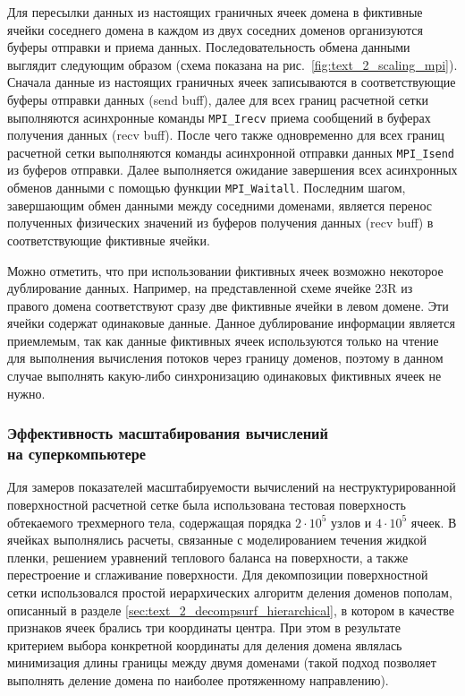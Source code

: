 Для пересылки данных из настоящих граничных ячеек домена в фиктивные ячейки соседнего домена в каждом из двух соседних доменов организуются буферы отправки и приема данных.
Последовательность обмена данными выглядит следующим образом (схема показана на рис.~\ref{fig:text_2_scaling_mpi}).
Сначала данные из настоящих граничных ячеек записываются в соответствующие буферы отправки данных (send buff), далее для всех границ расчетной сетки выполняются асинхронные команды \texttt{MPI\_Irecv} приема сообщений в буферах получения данных (recv buff).
После чего также одновременно для всех границ расчетной сетки выполняются команды асинхронной отправки данных \texttt{MPI\_Isend} из буферов отправки.
Далее выполняется ожидание завершения всех асинхронных обменов данными с помощью функции \texttt{MPI\_Waitall}.
Последним шагом, завершающим обмен данными между соседними доменами, является перенос полученных физических значений из буферов получения данных (recv buff) в соответствующие фиктивные ячейки.

Можно отметить, что при использовании фиктивных ячеек возможно некоторое дублирование данных.
Например, на представленной схеме ячейке 23R из правого домена соответствуют сразу две фиктивные ячейки в левом домене.
Эти ячейки содержат одинаковые данные.
Данное дублирование информации является приемлемым, так как данные фиктивных ячеек используются только на чтение для выполнения вычисления потоков через границу доменов, поэтому в данном случае выполнять какую-либо синхронизацию одинаковых фиктивных ячеек не нужно.

\subsubsection{Эффективность масштабирования вычислений \\ на суперкомпьютере}

Для замеров показателей масштабируемости вычислений на неструктурированной поверхностной расчетной сетке была использована тестовая поверхность обтекаемого трехмерного тела, содержащая порядка $2 \cdot 10^5$ узлов и $4 \cdot 10^5$ ячеек.
В ячейках выполнялись расчеты, связанные с моделированием течения жидкой пленки, решением уравнений теплового баланса на поверхности, а также перестроение и сглаживание поверхности.
Для декомпозиции поверхностной сетки использовался простой иерархических алгоритм деления доменов пополам\label{term:alg_decomp_hierarch3}, описанный в разделе \ref{sec:text_2_decompsurf_hierarchical}, в котором в качестве признаков ячеек брались три координаты центра.
При этом в результате критерием выбора конкретной координаты для деления домена являлась минимизация длины границы между двумя доменами (такой подход позволяет выполнять деление домена по наиболее протяженному направлению).

